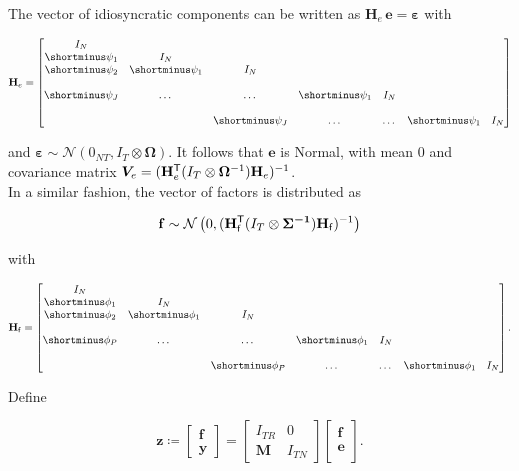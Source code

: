 \documentclass[notitlepage,a4paper,12pt]{article}
\newcommand{\transpose}[1]{{#1}^{\sf{T}}}
\begin{document}
The vector of idiosyncratic components can be written as $\mathbf{H}_e\, \mathbf{e} = \boldsymbol{\varepsilon}$ with 

$$
\mathbf{H}_e
=
\begin{bmatrix}
    I_N &  \\
    \shortminus \psi_1 & I_N &  \\
    \shortminus \psi_2 & \shortminus \psi_1 & I_N &  \\
     &  &  &  &  & \\
    \shortminus \psi_J & \dots & \dots & \shortminus \psi_1 & I_N \\
     &  &  &  &  & \\
    & & \shortminus \psi_J & \dots & \dots & \shortminus \psi_1 & I_N
\end{bmatrix}
$$

\noindent and $\boldsymbol{\varepsilon} \sim \mathcal{N}(0_{NT}, I_T \otimes \boldsymbol{\Omega})$. It follows that $\mathbf{e}$ is Normal, with mean $0$ and covariance matrix $\bm{V}_{e} = (\transpose{\mathbf{H}}_{e} (I_T \otimes \boldsymbol{\Omega}^{-1}) \mathbf{H}_e)^{-1}$. \\

In a similar fashion, the vector of factors is distributed as 

$$
\mathbf{f} \sim \mathcal{N}\left(0, (\transpose{\mathbf{H}}_{\sf{f}} (I_T \otimes \boldsymbol{\Sigma^{-1}}) \mathbf{H}_{\sf{f}})^{-1}\right)
$$

with 

$$
\mathbf{H}_{\sf{f}}
=
\begin{bmatrix}
    I_N &  \\
    \shortminus \phi_1 & I_N &  \\
    \shortminus \phi_2 & \shortminus \phi_1 & I_N &  \\
     &  &  &  &  & \\
    \shortminus \phi_P & \dots & \dots & \shortminus \phi_1 & I_N \\
     &  &  &  &  & \\
    & & \shortminus \phi_P & \dots & \dots & \shortminus \phi_1 & I_N
\end{bmatrix}.
$$

Define 

\begin{equation}
    \mathbf{z} 
    \coloneqq 
    \begin{bmatrix}
        \mathbf{f} \\
        \mathbf{y}
    \end{bmatrix} 
    = 
    \begin{bmatrix}
        I_{TR} & 0 \\
        \mathbf{M} & I_{TN} 
    \end{bmatrix}
    \begin{bmatrix}
        \mathbf{f}\\
        \mathbf{e}\\
    \end{bmatrix}.
\end{equation}
\end{document}
